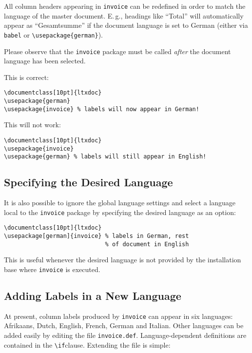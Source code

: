 \documentclass[11pt]{ltxdoc}
\begin{document}
All column headers appearing in \texttt{invoice} can be redefined in
order to match the language of the master document. E.\,g., headings
like ``Total'' will automatically appear as ``Gesamtsumme'' if the
document language is set to German (either via \texttt{babel} or
\verb-\usepackage{german}-).

Please observe that the \texttt{invoice} package must be called {\em
after} the document language has been selected.

This is correct:

\begin{verbatim}
\documentclass[10pt]{ltxdoc}
\usepackage{german}
\usepackage{invoice} % labels will now appear in German!
\end{verbatim}

This will not work:

\begin{verbatim}
\documentclass[10pt]{ltxdoc}
\usepackage{invoice}
\usepackage{german} % labels will still appear in English!
\end{verbatim}


\subsection{Specifying the Desired Language}

It is also possible to ignore the global language settings and select
a language local to the \texttt{invoice} package by specifying the
desired language as an option:

\begin{verbatim}
\documentclass[10pt]{ltxdoc}
\usepackage[german]{invoice} % labels in German, rest 
                             % of document in English
\end{verbatim}

This is useful whenever the desired language is not provided by the
installation base where \texttt{invoice} is executed.

\subsection{Adding Labels in a New Language}

At present, column labels produced by \texttt{invoice} can appear
in six languages: Afrikaans, Dutch, English, French, German and Italian.
Other languages can be added easily by editing the file
\verb-invoice.def-. Language-dependent definitions are contained in
the \verb-\if-clause. Extending the file is simple: 
\end{document}
